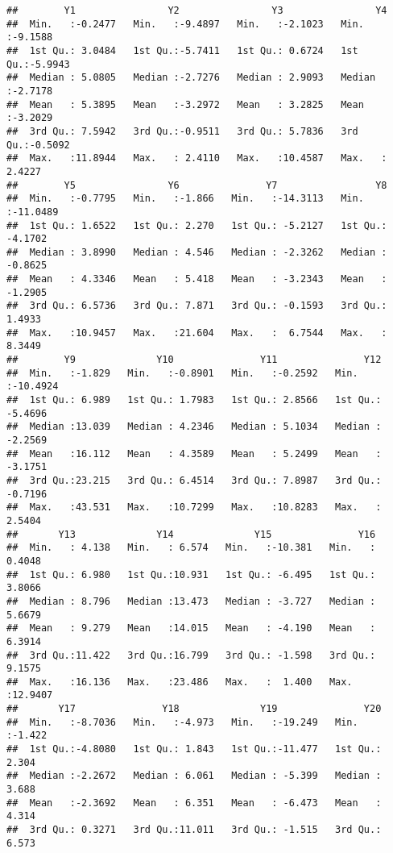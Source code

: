 \documentclass[
]{article}
\begin{document}
\begin{verbatim}
##        Y1                Y2                Y3                Y4         
##  Min.   :-0.2477   Min.   :-9.4897   Min.   :-2.1023   Min.   :-9.1588  
##  1st Qu.: 3.0484   1st Qu.:-5.7411   1st Qu.: 0.6724   1st Qu.:-5.9943  
##  Median : 5.0805   Median :-2.7276   Median : 2.9093   Median :-2.7178  
##  Mean   : 5.3895   Mean   :-3.2972   Mean   : 3.2825   Mean   :-3.2029  
##  3rd Qu.: 7.5942   3rd Qu.:-0.9511   3rd Qu.: 5.7836   3rd Qu.:-0.5092  
##  Max.   :11.8944   Max.   : 2.4110   Max.   :10.4587   Max.   : 2.4227  
##        Y5                Y6               Y7                 Y8          
##  Min.   :-0.7795   Min.   :-1.866   Min.   :-14.3113   Min.   :-11.0489  
##  1st Qu.: 1.6522   1st Qu.: 2.270   1st Qu.: -5.2127   1st Qu.: -4.1702  
##  Median : 3.8990   Median : 4.546   Median : -2.3262   Median : -0.8625  
##  Mean   : 4.3346   Mean   : 5.418   Mean   : -3.2343   Mean   : -1.2905  
##  3rd Qu.: 6.5736   3rd Qu.: 7.871   3rd Qu.: -0.1593   3rd Qu.:  1.4933  
##  Max.   :10.9457   Max.   :21.604   Max.   :  6.7544   Max.   :  8.3449  
##        Y9              Y10               Y11               Y12          
##  Min.   :-1.829   Min.   :-0.8901   Min.   :-0.2592   Min.   :-10.4924  
##  1st Qu.: 6.989   1st Qu.: 1.7983   1st Qu.: 2.8566   1st Qu.: -5.4696  
##  Median :13.039   Median : 4.2346   Median : 5.1034   Median : -2.2569  
##  Mean   :16.112   Mean   : 4.3589   Mean   : 5.2499   Mean   : -3.1751  
##  3rd Qu.:23.215   3rd Qu.: 6.4514   3rd Qu.: 7.8987   3rd Qu.: -0.7196  
##  Max.   :43.531   Max.   :10.7299   Max.   :10.8283   Max.   :  2.5404  
##       Y13              Y14              Y15               Y16         
##  Min.   : 4.138   Min.   : 6.574   Min.   :-10.381   Min.   : 0.4048  
##  1st Qu.: 6.980   1st Qu.:10.931   1st Qu.: -6.495   1st Qu.: 3.8066  
##  Median : 8.796   Median :13.473   Median : -3.727   Median : 5.6679  
##  Mean   : 9.279   Mean   :14.015   Mean   : -4.190   Mean   : 6.3914  
##  3rd Qu.:11.422   3rd Qu.:16.799   3rd Qu.: -1.598   3rd Qu.: 9.1575  
##  Max.   :16.136   Max.   :23.486   Max.   :  1.400   Max.   :12.9407  
##       Y17               Y18              Y19               Y20        
##  Min.   :-8.7036   Min.   :-4.973   Min.   :-19.249   Min.   :-1.422  
##  1st Qu.:-4.8080   1st Qu.: 1.843   1st Qu.:-11.477   1st Qu.: 2.304  
##  Median :-2.2672   Median : 6.061   Median : -5.399   Median : 3.688  
##  Mean   :-2.3692   Mean   : 6.351   Mean   : -6.473   Mean   : 4.314  
##  3rd Qu.: 0.3271   3rd Qu.:11.011   3rd Qu.: -1.515   3rd Qu.: 6.573  

\end{verbatim}
\end{document}
